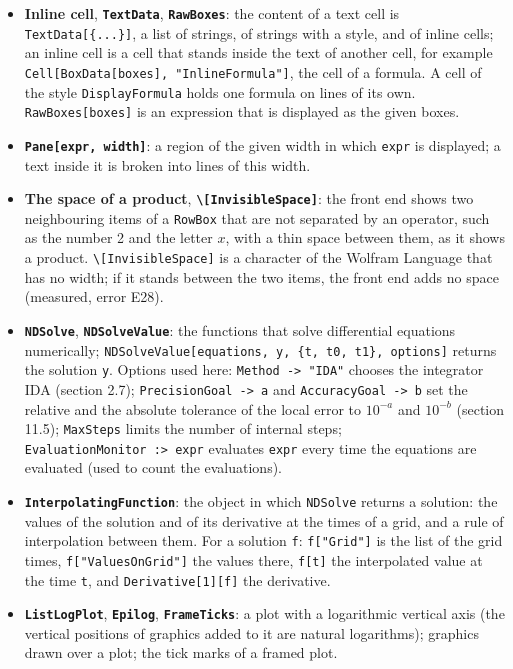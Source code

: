 \documentclass[
  10pt,
]{article}
\begin{document}
\begin{itemize}
  below and above it (the limits of a sum); and the statement that boxes
  are to be shown in \texttt{TraditionalForm}.
\item
  \textbf{Inline cell}, \textbf{\texttt{TextData}},
  \textbf{\texttt{RawBoxes}}: the content of a text cell is
  \texttt{TextData{[}\{...\}{]}}, a list of strings, of strings with a
  style, and of inline cells; an inline cell is a cell that stands
  inside the text of another cell, for example
  \texttt{Cell{[}BoxData{[}boxes{]},\ "InlineFormula"{]}}, the cell of a
  formula. A cell of the style \texttt{DisplayFormula} holds one formula
  on lines of its own. \texttt{RawBoxes{[}boxes{]}} is an expression
  that is displayed as the given boxes.
\item
  \textbf{\texttt{Pane{[}expr,\ width{]}}}: a region of the given width
  in which \texttt{expr} is displayed; a text inside it is broken into
  lines of this width.
\item
  \textbf{The space of a product},
  \textbf{\texttt{\textbackslash{}{[}InvisibleSpace{]}}}: the front end
  shows two neighbouring items of a \texttt{RowBox} that are not
  separated by an operator, such as the number 2 and the letter \(x\),
  with a thin space between them, as it shows a product.
  \texttt{\textbackslash{}{[}InvisibleSpace{]}} is a character of the
  Wolfram Language that has no width; if it stands between the two
  items, the front end adds no space (measured, error E28).
\item
  \textbf{\texttt{NDSolve}}, \textbf{\texttt{NDSolveValue}}: the
  functions that solve differential equations numerically;
  \texttt{NDSolveValue{[}equations,\ y,\ \{t,\ t0,\ t1\},\ options{]}}
  returns the solution \texttt{y}. Options used here:
  \texttt{Method\ -\textgreater{}\ "IDA"} chooses the integrator IDA
  (section 2.7); \texttt{PrecisionGoal\ -\textgreater{}\ a} and
  \texttt{AccuracyGoal\ -\textgreater{}\ b} set the relative and the
  absolute tolerance of the local error to \(10^{-a}\) and \(10^{-b}\)
  (section 11.5); \texttt{MaxSteps} limits the number of internal steps;
  \texttt{EvaluationMonitor\ :\textgreater{}\ expr} evaluates
  \texttt{expr} every time the equations are evaluated (used to count
  the evaluations).
\item
  \textbf{\texttt{InterpolatingFunction}}: the object in which
  \texttt{NDSolve} returns a solution: the values of the solution and of
  its derivative at the times of a grid, and a rule of interpolation
  between them. For a solution \texttt{f}: \texttt{f{[}"Grid"{]}} is the
  list of the grid times, \texttt{f{[}"ValuesOnGrid"{]}} the values
  there, \texttt{f{[}t{]}} the interpolated value at the time
  \texttt{t}, and \texttt{Derivative{[}1{]}{[}f{]}} the derivative.
\item
  \textbf{\texttt{ListLogPlot}}, \textbf{\texttt{Epilog}},
  \textbf{\texttt{FrameTicks}}: a plot with a logarithmic vertical axis
  (the vertical positions of graphics added to it are natural
  logarithms); graphics drawn over a plot; the tick marks of a framed
  plot.
\end{itemize}
\end{document}
